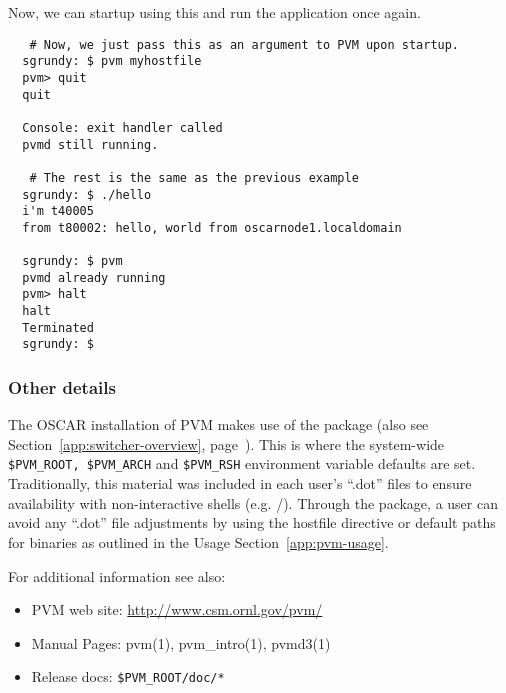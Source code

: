 \noindent Now, we can startup  using this 
and run the  application once again.

\begin{small}
\begin{verbatim}
   # Now, we just pass this as an argument to PVM upon startup.
  sgrundy: $ pvm myhostfile
  pvm> quit
  quit
  
  Console: exit handler called
  pvmd still running.

   # The rest is the same as the previous example
  sgrundy: $ ./hello
  i'm t40005
  from t80002: hello, world from oscarnode1.localdomain

  sgrundy: $ pvm
  pvmd already running
  pvm> halt
  halt
  Terminated
  sgrundy: $
\end{verbatim}
\end{small}

\subsubsection{Other details}

The OSCAR installation of PVM makes use of the 
package (also see Section~\ref{app:switcher-overview},
page~\pageref{app:switcher-overview}).  This is where the system-wide
\verb=$PVM_ROOT, $PVM_ARCH= and \verb=$PVM_RSH= environment variable
defaults are set.  Traditionally, this material was included in each
user's ``.dot'' files to ensure availability with non-interactive
shells (e.g. /).  Through the 
package, a user can avoid any ``.dot'' file adjustments by using the
hostfile directive or default paths for binaries as outlined in the
Usage Section~\ref{app:pvm-usage}.

\noindent For additional information see also:
\begin{itemize}
	\item PVM web site: \url{http://www.csm.ornl.gov/pvm/}
	\item Manual Pages: pvm(1), pvm\_intro(1), pvmd3(1)
	\item Release docs: \verb=$PVM_ROOT/doc/*=
\end{itemize}

